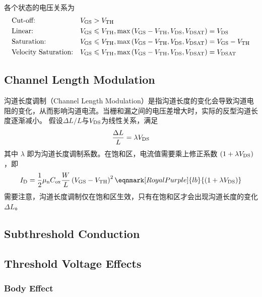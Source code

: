 各个状态的电压关系为
\begin{equation}
    \begin{aligned}
        & \text{Cut-off:} && V_{\rm{GS}} > V_{\rm{TH}} \\
        & \text{Linear:} && V_{\rm{GS}} \leqslant V_{\rm{TH}}, \max \left(V_{\rm{GS}} - V_{\rm{TH}}, V_{\rm{DS}}, V_{\rm{DSAT}}\right) = V_{\rm{DS}} \\
        & \text{Saturation:} && V_{\rm{GS}} \leqslant V_{\rm{TH}}, \max \left(V_{\rm{GS}} - V_{\rm{TH}}, V_{\rm{DS}}, V_{\rm{DSAT}}\right) = V_{\rm{GS}} - V_{\rm{TH}} \\
        & \text{Velocity Saturation:} && V_{\rm{GS}} \leqslant V_{\rm{TH}}, \max \left(V_{\rm{GS}} - V_{\rm{TH}}, V_{\rm{DS}}, V_{\rm{DSAT}}\right) = V_{\rm{DSAT}}
    \end{aligned}
\end{equation}

\subsection{Channel Length Modulation}
沟道长度调制（Channel Length Modulation）是指沟道长度的变化会导致沟道电阻的变化，从而影响沟道电流。当栅和漏之间的电压差增大时，实际的反型沟道长度逐渐减小。
假设$\Delta L / L$与$V_{\rm{DS}}$为线性关系，满足
\begin{equation}
    \frac{\Delta L}{L} = \lambda V_{\rm{DS}}
\end{equation}
其中 $\lambda$ 即为沟道长度调制系数。在饱和区，电流值需要乘上修正系数 $\left(1 + \lambda V_{\rm{DS}}\right)$，即
\begin{equation}
    I_{\rm{D}} = \frac{1}{2} \mu_{\rm{n}} C_{\rm{ox}} \frac{W}{L} \left( V_{\rm{GS}} - V_{\rm{TH}} \right)^2 \eqnmark[RoyalPurple]{lb}{\left( 1 + \lambda V_{\rm{DS}} \right)}
\end{equation}
需要注意，沟道长度调制仅在饱和区生效，只有在饱和区才会出现沟道长度的变化$\Delta L$。

\subsection{Subthreshold Conduction}

\subsection{Threshold Voltage Effects}
\subsubsection{Body Effect}

